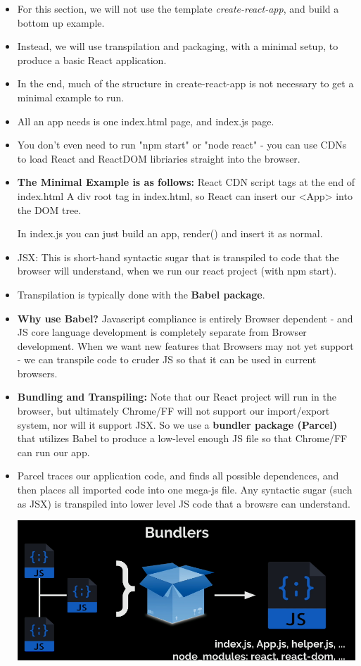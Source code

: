 \documentclass[8pt,a4paper]{extarticle}
\begin{document}
\begin{itemize}
\item For this section, we will not use the template \textit{create-react-app}, and build a bottom up example.
\item Instead, we will use transpilation and packaging, with a minimal setup, to produce a basic React application.
\item In the end, much of the structure in create-react-app is not necessary to get a minimal example to run.
\item All an app needs is one index.html page, and index.js page.
\item You don't even need to run "npm start" or "node react" - you can use CDNs to load React and ReactDOM libriaries straight into the browser.
\item \textbf{The Minimal Example is as follows:}
\mitem React CDN script tags at the end of index.html
\mitem A div root tag in index.html, so React can insert our <App> into the DOM tree.

In index.js you can just build an app, render() and insert it as normal.
\item JSX: This is short-hand syntactic sugar that is transpiled to code that the browser will understand, when we run our react project (with npm start).
\item Transpilation is typically done with the \textbf{Babel package}.
\item \textbf{Why use Babel?} Javascript compliance is entirely Browser dependent - and JS core language development is completely separate from Browser development. When we want new features that Browsers may not yet support - we can transpile code to cruder JS so that it can be used in current browsers.

\item \textbf{Bundling and Transpiling:} Note that our React project will run in the browser, but ultimately Chrome/FF will not support our import/export system, nor will it support JSX. So we use a \textbf{bundler package (Parcel)} that utilizes Babel to produce a low-level enough JS file so that Chrome/FF can run our app. 
\item Parcel traces our application code, and finds all possible dependences, and then places all imported code into one mega-js file. Any syntactic sugar (such as JSX) is transpiled into lower level JS code that a browsre can understand.

\includegraphics[scale=0.24]{bundle.png}


\end{itemize}
\end{document}
